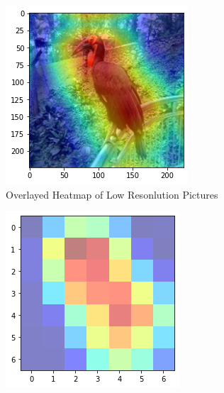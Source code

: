 \documentclass[10pt,twocolumn,letterpaper]{article}
\begin{document}
\begin{figure}[h]
\centering
    \begin{subfigure}{0.18\textwidth}
        \includegraphics[width=1\linewidth]{heatmap_LR.png} 
        \caption{Overlayed Heatmap of Low Resonlution Pictures}
        \label{fig:h1}
    \end{subfigure}
    \begin{subfigure}{0.18\textwidth}
        \includegraphics[width=1\linewidth]{heat_LR.PNG}

\end{subfigure}
\end{figure}
\end{document}
